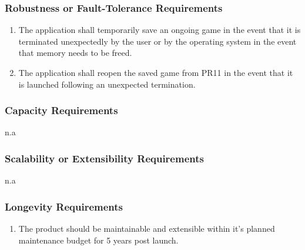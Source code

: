 \documentclass[]{article}
\begin{document}
\subsubsection{Robustness or Fault-Tolerance Requirements}
\label{ssub:robustness_or_fault_tolerance_requirements}
\begin{enumerate}[{PR}1. ]
	\resumeEnum
	\item The application shall temporarily save an ongoing game in the event that it is terminated unexpectedly by the user or by the operating system in the event that memory needs to be freed.
	\item The application shall reopen the saved game from PR11 in the event that it is launched following an unexpected termination.
	\holdEnum
\end{enumerate}

\subsubsection{Capacity Requirements}
\label{ssub:capacity_requirements}
n.a

\subsubsection{Scalability or Extensibility Requirements}
\label{ssub:scalability_or_extensibility_requirements}
n.a

\subsubsection{Longevity Requirements}
\label{ssub:longevity_requirements}
\begin{enumerate}[{PR}1. ]
	\resumeEnum
	\item The product should be maintainable and extensible within it's planned maintenance budget for 5 years post launch.
\end{enumerate}
\end{document}
